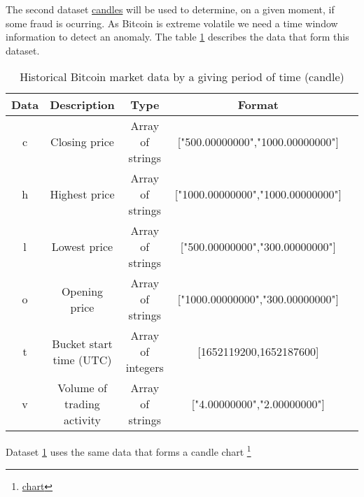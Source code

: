The second dataset \href{https://api.mercadobitcoin.net/api/v4/docs\#tag/Public-Data/paths/\~1candles/get}{candles} will be used to determine, on a given moment, if some fraud is ocurring. As Bitcoin is extreme volatile we need a time window information to detect an anomaly. The table \ref{dataset2} describes the data that form this dataset.

\begin{table}[ht]
    \centering
    \caption{Historical Bitcoin market data by a giving period of time (candle)}
    \label{dataset2}
    \setlength{\tabcolsep}{2pt}
    \small
    \begin{tabular}{|c | c | c | c | c|}
    \hline
    \multicolumn{1}{|p{2cm}}{\centering Data} &
    \multicolumn{1}{|p{2cm}}{\centering Description} & 
    \multicolumn{1}{|p{2cm}}{\centering Type} & 
    \multicolumn{1}{|p{2.8cm}|}{\centering Format} \\ \hline
    \multirow{1}{*}{\centering c} & \centering Closing price & Array of strings & ["500.00000000","1000.00000000"]\\ \hline
    \multirow{1}{*}{\centering h} & \centering Highest price & Array of strings & ["1000.00000000","1000.00000000"]\\ \hline
    \multirow{1}{*}{\centering l}& \centering Lowest price & Array of strings & ["500.00000000","300.00000000"]\\ \hline
    \multirow{1}{*}{\centering o}& \centering Opening price & Array of strings & ["1000.00000000","300.00000000"]\\ \hline
    \multirow{1}{*}{\centering t}& \centering Bucket start time (UTC) & Array of integers & [1652119200,1652187600]\\ \hline
    \multirow{1}{*}{\centering v}& \centering Volume of trading activity & Array of strings & ["4.00000000","2.00000000"]\\ \hline
    \end{tabular}
\end{table}

Dataset \ref{dataset2} uses the same data that forms a candle chart \footnote{\href{https://br.tradingview.com/symbols/BTCBRL/?exchange=MERCADO}{chart}}
